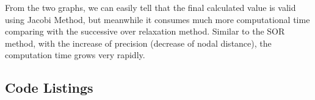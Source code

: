 \documentclass[a4paper,titlepage]{article}
\begin{document}
			From the two graphs, we can easily tell that the final calculated value is valid using Jacobi Method, but meanwhile it consumes much more computational time comparing with the successive over relaxation method. Similar to the SOR method, with the increase of precision (decrease of nodal distance), the computation time grows very rapidly. 
											
	\onecolumn
	\begin{appendices}
		
		\section{Code Listings} \label{appendix:code}
		
		
		\begin{center}
			\inputminted{python}{../matrix.py}
			\label{lst:matrices}
		\end{center}
		
		\begin{center}
			\inputminted{python}{../choleski.py}
			\label{lst:choleski}
		\end{center}
		
		\begin{center}
			\inputminted{python}{../linearNetwork.py}
			\label{lst:linear_networks}
		\end{center}
		\begin{center}
			\inputminted{python}{../finite_difference.py}
			\label{lst:fd}
		\end{center}
		
	\end{appendices}
	
\end{document}

